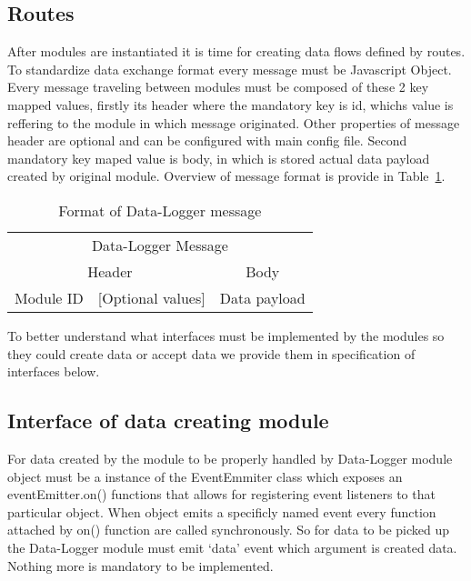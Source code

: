 \subsection{Routes} %
\label{sub:routes}
After modules are instantiated it is time for creating data flows defined by routes. To standardize data exchange format every message must be Javascript Object. Every message traveling between modules must be composed of these 2 key mapped values, firstly its header where the mandatory key is id, whichs value is reffering to the module in which message originated. Other properties of message header are optional and can be configured with main config file. Second mandatory key maped value is body, in which is stored actual data payload created by original module. Overview of message format is provide in Table~\ref{tab:tab7}.
\begin{table}[H]
 \begin{center}
   \begin{tabular}{l l l l}
   \toprule
   \multicolumn{4}{c}{Data-Logger Message}\\
   \multicolumn{2}{c}{Header} & \multicolumn{2}{c}{Body} \\
   \midrule
   Module ID & [Optional values] & \multicolumn{2}{c}{Data payload}\\   
   \end{tabular}
 \end{center}
 \caption{Format of Data-Logger message}
 \label{tab:tab7}
\end{table}
To better understand what interfaces must be implemented by the modules so they could create data or accept data we provide them in specification of interfaces below.
\subsection{Interface of data creating module} %
\label{ssub:interface_of_data_creating_module}
For data created by the module to be properly handled by Data-Logger module object must be a instance of the EventEmmiter class which exposes an eventEmitter.on() functions that allows for registering event listeners to that particular object. When object emits a specificly named event every function attached by on() function are called synchronously. So for data to be picked up the Data-Logger module must emit `data' event which argument is created data. Nothing more is mandatory to be implemented.

